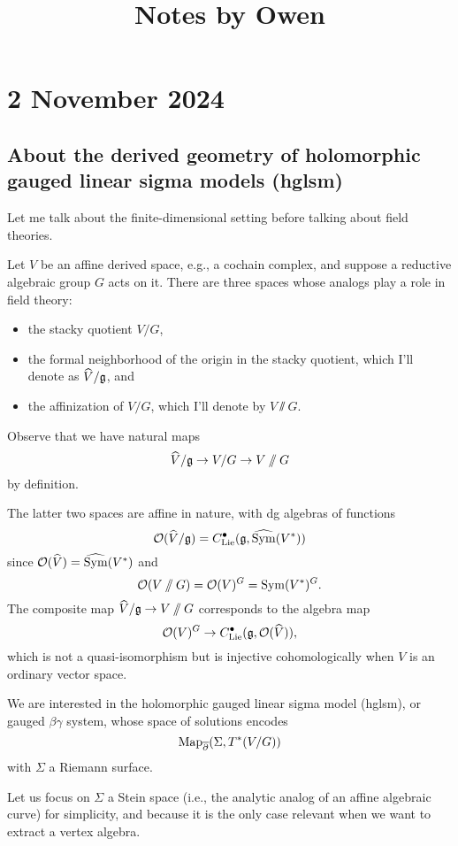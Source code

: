 \documentclass[11pt]{amsart}
\newcommand{\clie}{C^\bu_{\rm Lie}}
\newcommand{\csym}{\widehat{\Sym}}
\begin{document}
 

\title{Notes by Owen}

\maketitle

\section{2 November 2024}

\subsection{About the derived geometry of holomorphic gauged linear sigma models (hglsm)}

Let me talk about the finite-dimensional setting before talking about field theories.

Let $V$ be an affine derived space, e.g., a cochain complex,
and suppose a reductive algebraic group $G$ acts on it.
There are three spaces whose analogs play a role in field theory:
\begin{itemize}
\item the stacky quotient $V/G$,
\item the formal neighborhood of the origin in the stacky quotient, which I'll denote as $\widehat{V}/\mathfrak g$, and
\item the affinization of $V/G$, which I'll denote by $V \sslash G$.
\end{itemize}
Observe that we have natural maps
\[
\widehat{V}/\mathfrak g \to V/G \to V\mathbin{/\mkern-6mu/} G
\]
by definition.

The latter two spaces are affine in nature, with dg algebras of functions
\[
\cO(\widehat{V}/\fg) = \clie(\fg, \csym(V^*))
\]
since $\cO(\widehat{V}) = \csym(V^*)$ and
\[
\mathcal O(V\mathbin{/\mkern-6mu/} G) = \mathcal O(V)^G = \operatorname{Sym}(V^*)^G.
\]
The composite map $\widehat{V}/\mathfrak g \to V\mathbin{/\mkern-6mu/} G$ corresponds to the algebra map
\[
\cO(V)^G \to \clie(\fg, \cO(\widehat{V})),
\]
which is not a quasi-isomorphism but is injective cohomologically when $V$ is an ordinary vector space.

We are interested in the holomorphic gauged linear sigma model (hglsm), or gauged $\beta\gamma$ system, whose space of solutions encodes
\[
{\rm Map}_{\overline{\partial}}(\Sigma, T^*(V/G))
\]
with $\Sigma$ a Riemann surface.

Let us focus on $\Sigma$ a Stein space (i.e., the analytic analog of an affine algebraic curve) 
for simplicity, and because it is the only case relevant when we want to extract a vertex algebra.
\end{document}
